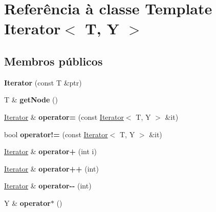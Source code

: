 \hypertarget{classIterator}{}\section{Referência à classe Template Iterator$<$ T, Y $>$}
\label{classIterator}
\subsection*{Membros públicos}
\begin{DoxyCompactItemize}
\item 
{\bfseries Iterator} (const T \&ptr)\hypertarget{classIterator_ab0a19499ba6b5a425322c913f38073c5}{}\label{classIterator_ab0a19499ba6b5a425322c913f38073c5}

\item 
T \& {\bfseries get\+Node} ()\hypertarget{classIterator_ab0f1a3252cae75d23f6e51379643d9f4}{}\label{classIterator_ab0f1a3252cae75d23f6e51379643d9f4}

\item 
\hyperlink{classIterator}{Iterator} \& {\bfseries operator=} (const \hyperlink{classIterator}{Iterator}$<$ T, Y $>$ \&it)\hypertarget{classIterator_a7ff27c62aa9a0214ec85b7927f9b13f8}{}\label{classIterator_a7ff27c62aa9a0214ec85b7927f9b13f8}

\item 
bool {\bfseries operator!=} (const \hyperlink{classIterator}{Iterator}$<$ T, Y $>$ \&it)\hypertarget{classIterator_afe4763f20cb78b414ea83be8b970de2d}{}\label{classIterator_afe4763f20cb78b414ea83be8b970de2d}

\item 
\hyperlink{classIterator}{Iterator} \& {\bfseries operator+} (int i)\hypertarget{classIterator_a5078670d19afa2428e1b24d0776277d5}{}\label{classIterator_a5078670d19afa2428e1b24d0776277d5}

\item 
\hyperlink{classIterator}{Iterator} \& {\bfseries operator++} (int)\hypertarget{classIterator_a1539a98c378cc2603811a495839627a1}{}\label{classIterator_a1539a98c378cc2603811a495839627a1}

\item 
\hyperlink{classIterator}{Iterator} \& {\bfseries operator-\/-\/} (int)\hypertarget{classIterator_ad0408f517904d4c060473f9593399ff4}{}\label{classIterator_ad0408f517904d4c060473f9593399ff4}

\item 
Y \& {\bfseries operator$\ast$} ()\hypertarget{classIterator_ae568e1ac8154f256e58b44e618d38d29}{}\label{classIterator_ae568e1ac8154f256e58b44e618d38d29}

\end{DoxyCompactItemize}
